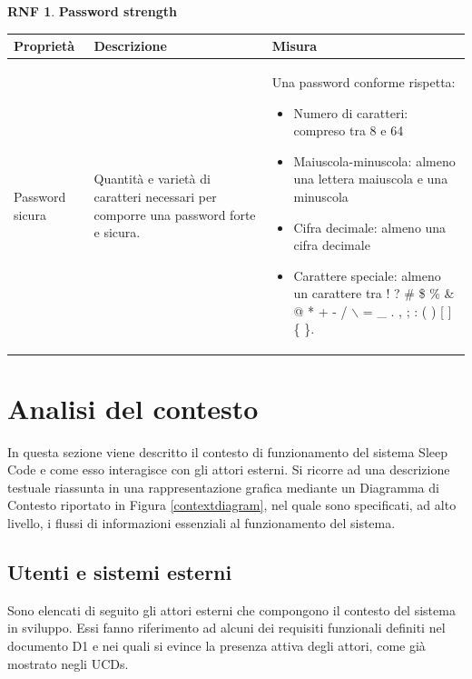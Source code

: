 \documentclass[11pt, a4paper]{article}
\theoremstyle{definition} %
\newtheorem{nonfuncreq}{RNF} %
\begin{document}
\newpage
\begin{nonfuncreq}
    \textbf{Password strength }
    \begin{center}
        \footnotesize
        \begin{tabularx}{\textwidth}{|X||X||X|}
            \hline
            \cellcolor{red!70}Proprietà & \cellcolor{red!70}Descrizione & \cellcolor{red!70}Misura\\
            \hline
            Password sicura & Quantità e varietà di caratteri necessari per comporre una password forte e sicura. & Una password conforme rispetta:
            \begin{itemize}[leftmargin = *]
                \item Numero di caratteri: compreso tra 8 e 64
                \item Maiuscola-minuscola: almeno una lettera maiuscola e una minuscola
                \item Cifra decimale: almeno una cifra decimale
                \item Carattere speciale: almeno un carattere tra  ! ? \# \$ \% \& @ * + - / $\backslash$ = \_ . , ; : ( ) [ ] \{ \}.
            \end{itemize}\\
            \hline
        \end{tabularx}
    \end{center}
\end{nonfuncreq}





\newpage
\section{Analisi del contesto}
In questa sezione viene descritto il contesto di funzionamento del sistema
Sleep Code e come esso interagisce con gli attori esterni. Si
ricorre ad una descrizione testuale riassunta in una rappresentazione
grafica mediante un Diagramma di Contesto riportato in
Figura \ref{contextdiagram}, nel quale sono specificati, ad alto livello,
i flussi di informazioni essenziali al funzionamento del sistema.

\subsection{Utenti e sistemi esterni} %
Sono elencati di seguito gli attori esterni che compongono il contesto
del sistema in sviluppo. Essi fanno riferimento ad alcuni dei requisiti
funzionali definiti nel documento D1 e nei quali si evince la presenza
attiva degli attori, come già mostrato negli UCDs.
\end{document}
